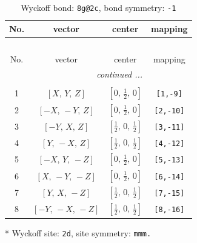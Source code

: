\documentclass[fleqn,8pt]{jsarticle}
\begin{document}
\renewcommand{\arraystretch}{1.2}
\begin{longtable}{cccc}
\caption{Wyckoff bond: {\tt 8g@2c}, bond symmetry: {\tt -1}}
 \\
 \hline \hline
No. & vector & center & mapping \\ \hline \endfirsthead

\multicolumn{3}{l}{\tablename\ \thetable{}} \\
 \hline \hline
No. & vector & center & mapping \\ \hline \endhead

 \hline \hline
\multicolumn{3}{r}{\footnotesize\it continued ...} \\ \endfoot

 \hline \hline
\multicolumn{3}{r}{} \\ \endlastfoot

1 & $\left[ X,\, Y,\, Z \right]$ & $\left[ 0,\, \frac{1}{2},\, 0 \right]$ & {\tt [1,-9]} \\ \hline
2 & $\left[ - X,\, - Y,\, Z \right]$ & $\left[ 0,\, \frac{1}{2},\, 0 \right]$ & {\tt [2,-10]} \\ \hline
3 & $\left[ - Y,\, X,\, Z \right]$ & $\left[ \frac{1}{2},\, 0,\, \frac{1}{2} \right]$ & {\tt [3,-11]} \\ \hline
4 & $\left[ Y,\, - X,\, Z \right]$ & $\left[ \frac{1}{2},\, 0,\, \frac{1}{2} \right]$ & {\tt [4,-12]} \\ \hline
5 & $\left[ - X,\, Y,\, - Z \right]$ & $\left[ 0,\, \frac{1}{2},\, 0 \right]$ & {\tt [5,-13]} \\ \hline
6 & $\left[ X,\, - Y,\, - Z \right]$ & $\left[ 0,\, \frac{1}{2},\, 0 \right]$ & {\tt [6,-14]} \\ \hline
7 & $\left[ Y,\, X,\, - Z \right]$ & $\left[ \frac{1}{2},\, 0,\, \frac{1}{2} \right]$ & {\tt [7,-15]} \\ \hline
8 & $\left[ - Y,\, - X,\, - Z \right]$ & $\left[ \frac{1}{2},\, 0,\, \frac{1}{2} \right]$ & {\tt [8,-16]} \\
\end{longtable}
* Wyckoff site: {\tt 2d}, site symmetry: {\tt mmm.}
\renewcommand{\arraystretch}{1.2}
\end{document}
